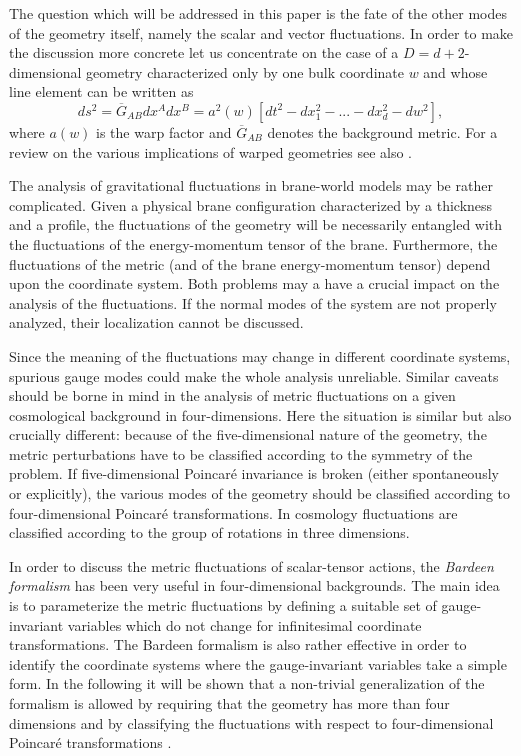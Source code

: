 \documentclass[a4paper,12pt]{article}
\begin{document}
The question which will be addressed in this paper
 is the fate of the other modes of the geometry 
itself, namely the scalar and vector fluctuations. In order 
to make the discussion more concrete let us concentrate on the case 
of a $ D = d + 2$-dimensional geometry characterized only 
by one bulk coordinate $w$ and whose line element can be written as 
\begin{equation}
ds^2 = \overline{G}_{A B} dx^A dx^B =
 a^2(w)[ dt^2 - d x_{1}^2 -...- d x_{d}^2 - dw^2],
\label{me}
\end{equation}
where $a(w)$ is the warp factor and $\overline{G}_{A B}$ denotes the 
background metric. For a review on the 
various implications of warped  geometries see also \cite{rub}.

The analysis of gravitational fluctuations in brane-world
models may be rather complicated. Given a physical 
brane configuration characterized by a thickness and a 
profile, the fluctuations of the geometry will be
necessarily entangled with the fluctuations of the 
energy-momentum tensor of the brane. Furthermore, the 
fluctuations of the metric (and of the brane energy-momentum tensor) 
depend upon the coordinate system. Both problems 
may a have a crucial impact on the analysis of the fluctuations. 
If 
the normal modes of the system are not properly analyzed, their localization 
cannot be discussed. 

Since the meaning of the 
fluctuations may change  in different coordinate 
systems, spurious gauge modes could make the whole 
analysis unreliable. 
Similar caveats should be borne in mind in the analysis of metric 
fluctuations on a given cosmological background in 
four-dimensions. Here the situation is similar but also 
crucially different: because of the five-dimensional 
nature of the geometry, the metric perturbations have to be 
classified according to the symmetry of the problem. If 
five-dimensional Poincar\'e invariance is broken (either 
spontaneously or explicitly), the various 
modes of the geometry should be classified according to four-dimensional 
Poincar\'e transformations. In cosmology 
fluctuations are classified according to the group of rotations 
in three dimensions.

In order to discuss the metric fluctuations of scalar-tensor 
actions, the {\em Bardeen formalism} \cite{bar} has been very useful in 
four-dimensional backgrounds. The main idea is to parameterize 
the metric fluctuations by defining a suitable set of gauge-invariant 
variables which do not change for infinitesimal coordinate 
transformations. The Bardeen formalism is also rather effective in order 
to identify the coordinate systems where the gauge-invariant 
variables take a simple form.  In the following it will be shown that 
a non-trivial generalization of the formalism 
is allowed by requiring that the geometry has more than four 
 dimensions and by classifying the fluctuations with respect 
to four-dimensional  Poincar\'e transformations \cite{n1}.
\end{document}
